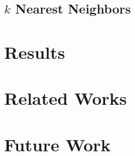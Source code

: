 \documentclass[letterpaper,11pt,twocolumn]{article}
\begin{document}
\subsection{$k$ Nearest Neighbors}


\section{Results}
\label{sec:eval}



\section{Related Works}
\label{sec:related}
\section{Future Work}
\label{sec:future}

% 


\end{document}
